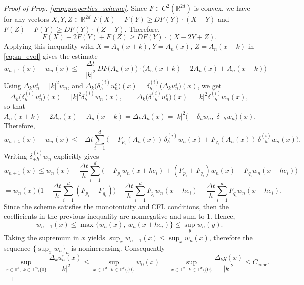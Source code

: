 \documentclass[10pt,a4paper]{amsart}
\newcommand{\T}{{\mathbb{T}}}
\begin{document}
\begin{proof}[Proof of Prop. \ref{prop:properties_scheme}]
	Since \(F\in C^2(\mathbb R^{2d})\) is convex, we have for any vectors \(X,Y,Z\in\mathbb R^{2d}\) \(F(X)-F(Y)\ge D F(Y)\cdot (X-Y)\) and \(F(Z)-F(Y)\ge D F(Y)\cdot (Z-Y)\). Therefore,
	\[
	F(X)-2F(Y)+F(Z)\ge D F(Y)\cdot (X-2Y+Z).
	\]
	Applying this inequality with
	\(X=A_n(x+k),\,Y=A_n(x),\,Z=A_n(x-k)\) in \eqref{eq:sn_evol} gives the estimate
	\[
		w_{n+1}(x)-w_n(x)
		\le -\frac{\Delta t}{|k|^2}\,D F\big(A_n(x)\big)\cdot\big(A_n(x+k)-2A_n(x)+A_n(x-k)\big)\]
Using \(\Delta_k u_n^\varepsilon=|k|^2 w_n\), and \(
\Delta_k\big(\delta^{(i)}_h u_n^\varepsilon\big)(x)
= \delta^{(i)}_h\big(\Delta_k u_n^\varepsilon\big)(x)
\), we get
\[
\Delta_k\big(\delta^{(i)}_h u_n^\varepsilon\big)(x)
=|k|^2\delta^{(i)}_h w_n(x),\qquad
\Delta_k\big(\delta^{(i)}_{-h} u_n^\varepsilon\big)(x)=|k|^2\delta^{(i)}_{-h} w_n(x),
\]
so that
\[
A_n(x+k)-2A_n(x)+A_n(x-k)=\Delta_k A_n(x)=|k|^2\big(-\delta_h w_n,\;\delta_{-h} w_n\big)(x).
\]
Therefore,
\[
w_{n+1}(x)-w_n(x)
\le -\Delta t\sum_{i=1}^d\big(-F_{p_i}(A_n(x))\,\delta^{(i)}_h w_n(x)
+F_{q_i}(A_n(x))\,\delta^{(i)}_{-h} w_n(x)\big).
\]
Writing \(\delta^{(i)}_{\pm h}w_n\) explicitly gives
\[
w_{n+1}(x)
\le w_n(x) -\frac{\Delta t}{h}\sum_{i=1}^d\Big(-F_{p_i}w_n(x+h e_i)+(F_{p_i}+F_{q_i})w_n(x)-F_{q_i}w_n(x-h e_i)\Big)
\]
\[
=w_n(x)\bigg(1 -\frac{\Delta t}{h}\sum_{i=1}^d(F_{p_i}+F_{q_i})\bigg)+\frac{\Delta t}{h}\sum_{i=1}^dF_{p_i}w_n(x+h e_i) +\frac{\Delta t}{h}\sum_{i=1}^dF_{q_i}w_n(x-h e_i).
\]
Since the scheme satisfies the monotonicity and CFL conditions, then the coefficients in the previous inequality are nonnegative and sum to $1$. Hence,
\[
w_{n+1}(x)\le\max\{w_n(x),\,w_n(x\pm h e_i)\}\le\sup_{y} w_n(y).
\]
Taking the supremum in $x$ yields $\sup_x w_{n+1}(x)\le\sup_x w_n(x)$, therefore the sequence $\{\sup_x w_n\}_n$ is nonincreasing. Consequently
\[
\sup_{x\in\T^d,\;k\in\T^d\setminus\{0\}}\frac{\Delta_k u_n^\varepsilon(x)}{|k|^2}
\le \sup_{x\in\T^d,\;k\in\T^d\setminus\{0\}} w_0(x)
= \sup_{x\in\T^d,\;k\in\T^d\setminus\{0\}}\frac{\Delta_k g(x)}{|k|^2}
\le C_{\mathrm{conc}}.
\]
\end{proof}
\end{document}

